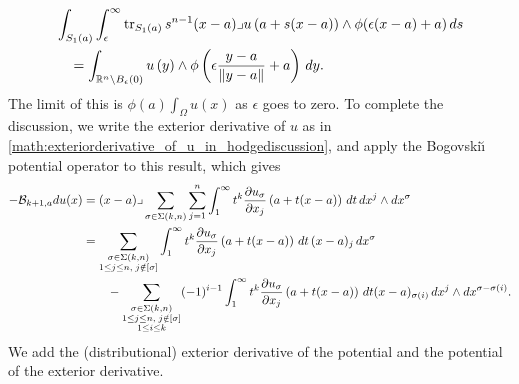 \documentclass[10pt,a4paper]{article}
\begin{document}
\begin{align*}
    & 
    \int_{ S_1(a) }
    \int_{\epsilon}^\infty 
    \operatorname{tr}_{S_1(a)}{ 
        s^{n-1} (x-a)\lrcorner u\left( a + s( x - a )\right) 
        \wedge \phi( \epsilon (x-a) + a ) 
    }
    \,ds 
    \\&\quad 
    =
    \int_{{\mathbb R}^{n} \setminus B_{\epsilon}(0)}
        u\left( y \right) 
        \wedge \phi\left( \epsilon \frac{y-a}{ \| y-a \| } + a \right) 
    \,dy 
    .
\end{align*}
The limit of this is $\phi(a) \int_\Omega u(x)$ as $\epsilon$ goes to zero. 
To complete the discussion, we write the exterior derivative of $u$ as in \eqref{math:exteriorderivative_of_u_in_hodgediscussion}, 
and apply the Bogovski\u{\i} potential operator to this result, which gives 
\begin{align*}
    - 
    {\mathcal B}_{k+1,a} d u(x)
    &=
    (x-a)\lrcorner 
    \sum_{\sigma \in \Sigma(k,n)} \sum_{j=1}^{n}
    \int_{1}^\infty t^{k} \frac{ \partial u_{\sigma} }{\partial x_{j}}\left(a+t(x-a)\right) \,dt 
    \,dx^{j} \wedge dx^{\sigma}
    \\&
    = 
    \sum_{\substack{ \sigma \in \Sigma(k,n) \\ 1 \leq j \leq n, \; j \notin [\sigma] }} 
    \int_{1}^\infty t^{k} \frac{ \partial u_{\sigma} }{\partial x_{j}}\left(a+t(x-a)\right) \,dt \,(x-a)_{j} \,dx^{\sigma}
    \\&\qquad 
    - 
    \sum_{\substack{ \sigma \in \Sigma(k,n) \\ 1 \leq j \leq n, \; j \notin [\sigma] \\ 1 \leq i \leq k }}
    (-1)^{i-1}
    \int_{1}^\infty t^{k} \frac{ \partial u_{\sigma} }{\partial x_{j}}\left(a+t(x-a)\right) \,dt 
    (x-a)_{\sigma(i)} \,dx^{j} \wedge dx^{\sigma-\sigma(i)}
    .
\end{align*}
We add the (distributional) exterior derivative of the potential and the potential of the exterior derivative.
\end{document}
